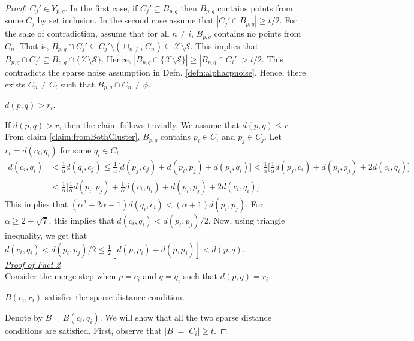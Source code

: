 \documentclass[11pt]{article}
\newcommand{\mc}{\mathcal}
\begin{document}
\begin{proof}
$C_j' \in Y_{p, q}$. In the first case, if $C_j' \subseteq B_{p, q}$ then $B_{p,q}$ contains points from some $C_j$ by set inclusion. In the second case assume that $|C_j' \cap B_{p,q}| \ge t/2$. For the sake of contradiction, assume that for all $n \neq i$, $B_{p, q}$ contains no points from $C_n$. That is, $B_{p, q} \cap C_j' \subseteq C_j' \setminus (\cup_{n \neq i} C_n) \subseteq \mc X \setminus \mc S$. This implies that $B_{p, q} \cap C_j' \subseteq B_{p,q} \cap \{\mc X \setminus \mc S\}$. Hence, $|B_{p, q}\cap \{\mc X \setminus \mc S\}| \ge |B_{p,q} \cap C_i'| > t/2$. This contradicts the sparse noise assumption in Defn. \ref{defn:alphacpnoise}. Hence, there exists $C_n \neq C_i$ such that $B_{p, q} \cap C_n \neq \phi$.


\begin{claim}
\label{claim:maxrirj}
$d(p, q) > r_i$.
\end{claim}

\noindent If $d(p, q) > r$, then the claim follows trivially. We assume that $d(p, q) \le r$. From claim \ref{claim:fromBothCluster}, $B_{p, q}$ contains $p_i \in C_i$ and $p_j \in C_j$. Let $r_i = d(c_i, q_i)$ for some $q_i \in C_i$.
\begin{align*}
d(c_i, q_i) &< \frac{1}{\alpha} d(q_i, c_j) \le \frac{1}{\alpha} \bigg[ d(p_j, c_j) + d(p_i, p_j) + d(p_i, q_i)\bigg] < \frac{1}{\alpha} \bigg[ \frac{1}{\alpha}d(p_j, c_i) + d(p_i, p_j) + 2d(c_i, q_i)\bigg]\\
& < \frac{1}{\alpha} \bigg[ \frac{1}{\alpha}d(p_i, p_j) + \frac{1}{\alpha}d(c_i, q_i) + d(p_i, p_j) + 2d(c_i, q_i)\bigg]
\end{align*}
This implies that $(\alpha^2 - 2\alpha - 1)d(q_i, c_i) < (\alpha + 1) d(p_i, p_j)$. For $\alpha \ge 2 + \sqrt 7$, this implies that $d(c_i, q_i) < d(p_i, p_j)/2$. Now, using triangle inequality, we get that $d(c_i, q_i) < d(p_i, p_j)/2 \le \frac{1}{2}[d(p, p_i) + d(p, p_j)] < d(p, q)$.\\

\noindent\textit{\underline{Proof of Fact 2}}\\
Consider the merge step when $p = c_i$ and $q = q_i$ such that $d(p, q) = r_i$.
\begin{claim}
\label{claim:dciqi}
$B(c_i, r_i)$ satisfies the sparse distance condition.
\end{claim}

\vspace{-0.1in} Denote by $B = B(c_i, q_i)$. We will show that all the two sparse distance conditions are satisfied. First, observe that $|B| = |C_i| \ge t$.


\end{proof}
\end{document}
